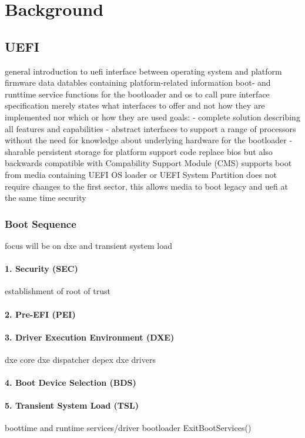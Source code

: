 %
\chapter{Background}


\section{UEFI}

general introduction to uefi
interface between operating system and platform firmware
data datables containing platform-related information
boot- and runttime service functions for the bootloader and os to call
pure interface specification
merely states what interfaces to offer and not how they are implemented nor which or how they are used
goals:
- complete solution describing all features and capabilities
- abstract interfaces to support a range of processors without the need for knowledge about underlying hardware for the bootloader
- sharable persistent storage for platform support code
replace bios but also backwards compatible with Compability Support Module (CMS)
supports boot from media containing UEFI OS loader or UEFI System Partition
does not require changes to the first sector, this allows media to boot legacy and uefi at the same time
security

\subsection{Boot Sequence}
focus will be on dxe and transient system load
\subsubsection{1. Security (SEC)}
establishment of root of trust
\subsubsection{2. Pre-EFI (PEI)}
\subsubsection{3. Driver Execution Environment (DXE)}
dxe core
dxe dispatcher
depex
dxe drivers
\subsubsection{4. Boot Device Selection (BDS)}
\subsubsection{5. Transient System Load (TSL)}
boottime and runtime services/driver
bootloader
ExitBootServices()
